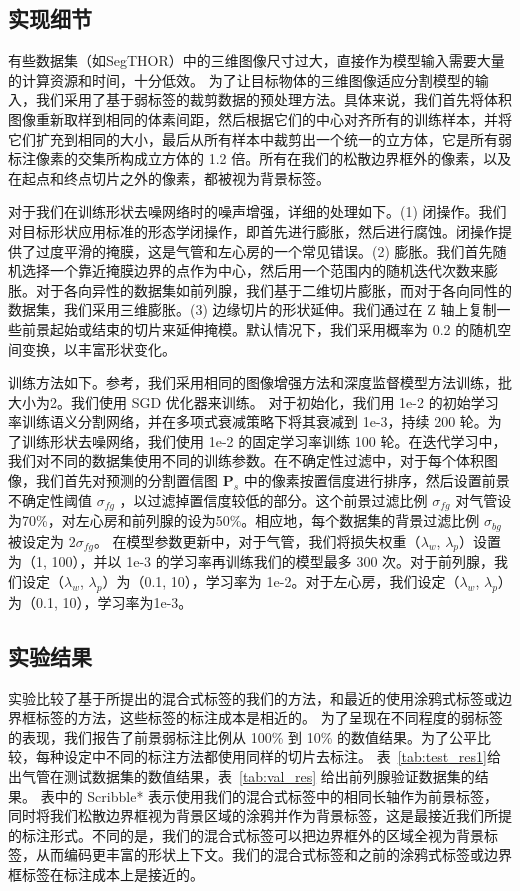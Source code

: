 \subsection{实现细节} \label{sec:detail}

有些数据集（如SegTHOR）中的三维图像尺寸过大，直接作为模型输入需要大量的计算资源和时间，十分低效。
为了让目标物体的三维图像适应分割模型的输入，我们采用了基于弱标签的裁剪数据的预处理方法。具体来说，我们首先将体积图像重新取样到相同的体素间距，然后根据它们的中心对齐所有的训练样本，并将它们扩充到相同的大小，最后从所有样本中裁剪出一个统一的立方体，它是所有弱标注像素的交集所构成立方体的 1.2 倍。所有在我们的松散边界框外的像素，以及在起点和终点切片之外的像素，都被视为背景标签。

对于我们在训练形状去噪网络时的噪声增强，详细的处理如下。(1) 闭操作。我们对目标形状应用标准的形态学闭操作，即首先进行膨胀，然后进行腐蚀。闭操作提供了过度平滑的掩膜，这是气管和左心房的一个常见错误。(2) 膨胀。我们首先随机选择一个靠近掩膜边界的点作为中心，然后用一个范围内的随机迭代次数来膨胀。对于各向异性的数据集如前列腺，我们基于二维切片膨胀，而对于各向同性的数据集，我们采用三维膨胀。(3) 边缘切片的形状延伸。我们通过在 Z 轴上复制一些前景起始或结束的切片来延伸掩模。默认情况下，我们采用概率为 0.2 的随机空间变换，以丰富形状变化。

训练方法如下。参考\citet{isensee2019automated}，我们采用相同的图像增强方法和深度监督模型方法训练，批大小为2。我们使用 SGD 优化器来训练。
对于初始化，我们用 1e-2 的初始学习率训练语义分割网络，并在多项式衰减策略下将其衰减到 1e-3，持续 200 轮。为了训练形状去噪网络，我们使用 1e-2 的固定学习率训练 100 轮。在迭代学习中，我们对不同的数据集使用不同的训练参数。在不确定性过滤中，对于每个体积图像，我们首先对预测的分割置信图 $\mathbf{P}_s$ 中的像素按置信度进行排序，然后设置前景不确定性阈值 $\sigma_{fg}$ ，以过滤掉置信度较低的部分。这个前景过滤比例 $\sigma_{fg}$ 对气管设为70\%，对左心房和前列腺的设为50\%。相应地，每个数据集的背景过滤比例 $\sigma_{bg}$ 被设定为  $2\sigma_{fg}$。
在模型参数更新中，对于气管，我们将损失权重（$\lambda_w$, $\lambda_p$）设置为（1, 100），并以 1e-3 的学习率再训练我们的模型最多 300 次。对于前列腺，我们设定（$\lambda_w$, $\lambda_p$）为（0.1, 10），学习率为 1e-2。对于左心房，我们设定（$\lambda_w$, $\lambda_p$）为（0.1, 10），学习率为1e-3。


\subsection{实验结果} \label{sec:res1}

实验比较了基于所提出的混合式标签的我们的方法，和最近的使用涂鸦式标签或边界框标签的方法，这些标签的标注成本是相近的。
为了呈现在不同程度的弱标签的表现，我们报告了前景弱标注比例从 100\% 到 10\% 的数值结果。为了公平比较，每种设定中不同的标注方法都使用同样的切片去标注。
表~\ref{tab:test_res1}给出气管在测试数据集的数值结果，表~\ref{tab:val_res} 给出前列腺验证数据集的结果。%
表中的 Scribble* 表示使用我们的混合式标签中的相同长轴作为前景标签，同时将我们松散边界框视为背景区域的涂鸦并作为背景标签，这是最接近我们所提的标注形式。不同的是，我们的混合式标签可以把边界框外的区域全视为背景标签，从而编码更丰富的形状上下文。我们的混合式标签和之前的涂鸦式标签或边界框标签在标注成本上是接近的。

